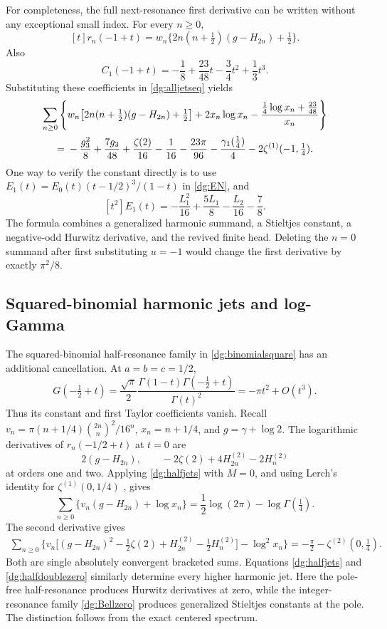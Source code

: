 For completeness, the full next-resonance first derivative can be
written without any exceptional small index. For every $n\ge0$,
\[
 [t]r_n(-1+t)=w_n\{2n(n+\tfrac12)(g-H_{2n})+\tfrac12\}.
\]
Also
\[
 C_1(-1+t)=-\frac18+\frac{23}{48}t-\frac34t^2+\frac13t^3.
\]
Substituting these coefficients in \eqref{dg:alljetseq} yields
\begin{align}
 \sum_{n\ge0}\Bigg\{&
 w_n\big[2n(n+\tfrac12)(g-H_{2n})+\tfrac12\big]
 +2x_n\log x_n
 -\frac{\tfrac14\log x_n+\tfrac{23}{48}}{x_n}\Bigg\}
 \notag\\
 ={}&-\frac{g_3^2}{8}+\frac{7g_3}{48}+\frac{\zeta(2)}{16}
 -\frac1{16}-\frac{23\pi}{96}
 -\frac{\gamma_1(\tfrac14)}4-2\zeta^{(1)}(-1,\tfrac14).
 \label{dg:quarticN1jet}
\end{align}
One way to verify the constant directly is to use
$E_1(t)=E_0(t)(t-1/2)^3/(1-t)$ in \eqref{dg:EN}, and
\[
 [t^2]E_1(t)=-\frac{L_1^2}{16}
                +\frac{5L_1}{8}-\frac{L_2}{16}-\frac78.
\]
The formula combines a generalized harmonic summand, a Stieltjes
constant, a negative-odd Hurwitz derivative, and the revived finite
head. Deleting the $n=0$ summand after first substituting $u=-1$
would change the first derivative by exactly $\pi^2/8$.

\subsection{Squared-binomial harmonic jets and log-Gamma}
The squared-binomial half-resonance family in
\eqref{dg:binomialsquare} has an additional cancellation. At
$a=b=c=1/2$,
\begin{equation}\label{dg:halfdoublezero}
 G(-\tfrac12+t)=\frac{\sqrt\pi}{2}
       \frac{\Gamma(1-t)\Gamma(-\tfrac12+t)}{\Gamma(t)^2}
       =-\pi t^2+O(t^3).
\end{equation}
Thus its constant and first Taylor coefficients vanish. Recall
$v_n=\pi(n+1/4)\binom{2n}{n}^2/16^n$, $x_n=n+1/4$, and
$g=\gamma+\log2$. The logarithmic derivatives of
$r_n(-1/2+t)$ at $t=0$ are
\[
 2(g-H_{2n}),\qquad
 -2\zeta(2)+4H_{2n}^{(2)}-2H_n^{(2)}
\]
at orders one and two. Applying \eqref{dg:halfjets} with $M=0$,
and using Lerch's identity for $\zeta^{(1)}(0,1/4)$
\cite[Eq.~25.11.18]{dlmf-hurwitz}, gives
\begin{equation}\label{dg:squaredharmonic1}
 \boxed{\sum_{n\ge0}\{v_n(g-H_{2n})+\log x_n\}
 =\frac12\log(2\pi)-\log\Gamma(\tfrac14).}
\end{equation}
The second derivative gives
\begin{align}
 \sum_{n\ge0}\Big\{v_n\big[(g-H_{2n})^2
       -\tfrac12\zeta(2)+H_{2n}^{(2)}-\tfrac12H_n^{(2)}\big]
                         -\log^2x_n\Big\}
 =-\frac\pi2-\zeta^{(2)}(0,\tfrac14).
 \label{dg:squaredharmonic2}
\end{align}
Both are single absolutely convergent bracketed sums. Equations
\eqref{dg:halfjets} and \eqref{dg:halfdoublezero} similarly determine
every higher harmonic jet. Here the pole-free half-resonance produces
Hurwitz derivatives at zero, while the integer-resonance family
\eqref{dg:Bellzero} produces generalized Stieltjes constants at the
pole. The distinction follows from the exact centered spectrum.
